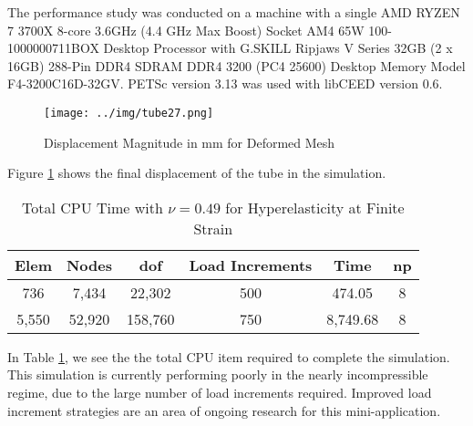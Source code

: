 The performance study was conducted on a machine with a single AMD RYZEN 7 3700X 8-core 3.6GHz (4.4 GHz Max Boost) Socket AM4 65W 100-1000000711BOX Desktop Processor with G.SKILL Ripjaws V Series 32GB (2 x 16GB) 288-Pin DDR4 SDRAM DDR4 3200 (PC4 25600) Desktop Memory Model F4-3200C16D-32GV.
PETSc \cite{petsc-user-ref} version 3.13 was used with libCEED \cite{libceed} version 0.6.

\begin{figure}[ht!]
\begin{center}
\texttt{[image: ../img/tube27.png]}
\end{center}
\caption{Displacement Magnitude in mm for Deformed Mesh}
\label{fig:hyper-press} 
\end{figure}

Figure \ref{fig:hyper-press} shows the final displacement of the tube in the simulation.

\begin{table}[ht!]
\begin{center}
\begin{tabular}{c c c c c c} 
 \toprule
 Elem & Nodes & dof & Load Increments & Time & np \\ [0.5ex] 
 \midrule
736   &  7,434 &  22,302 & 500  &  474.05   & 8\\ 
5,550 & 52,920 & 158,760 & 750  &  8,749.68 & 8\\
 \bottomrule
\end{tabular}
\end{center}
\caption{Total CPU Time with $\nu = 0.49$ for Hyperelasticity at Finite Strain}
 \label{table:hyper-meshSizes}
\end{table}

In Table \ref{table:hyper-meshSizes}, we see the the total CPU item required to complete the simulation.
This simulation is currently performing poorly in the nearly incompressible regime, due to the large number of load increments required.
Improved load increment strategies are an area of ongoing research for this mini-application.